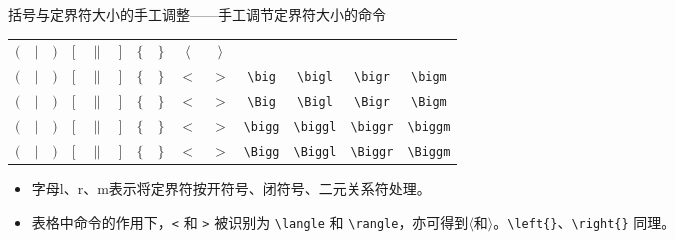 \documentclass[mathserif]{beamer}
\begin{document}
\begin{frame}[fragile]{括号与定界符}{大小的手工调整——手工调节定界符大小的命令}
\begin{table}[H]
\centering
\begin{tabular}{cccccccccc|cccc}
	\toprule
	$($ & $|$ & $)$ & $[$ & $\|$ & $]$ & $\{$ & $\}$ & $\langle$ & $\rangle$ & ~ & ~ & ~ & ~ \\
	$\big($ & $\big|$ & $\big)$ & $\big[$ & $\big\|$ & $\big]$ & $\big\{$ & $\big\}$ & $\big<$ & $\big>$ & \lstinline'\big' & \lstinline'\bigl' & \lstinline'\bigr' & \lstinline'\bigm' \\[1ex]
	$\Big($ & $\Big|$ & $\Big)$ & $\Big[$ & $\Big\|$ & $\Big]$ & $\Big\{$ & $\Big\}$ & $\Big<$ & $\Big>$ & \lstinline'\Big' & \lstinline'\Bigl' & \lstinline'\Bigr' & \lstinline'\Bigm' \\[2ex]
	$\bigg($ & $\bigg|$ & $\bigg)$ & $\bigg[$ & $\bigg\|$ & $\bigg]$ & $\bigg\{$ & $\bigg\}$ & $\bigg<$ & $\bigg>$ & \lstinline'\bigg' & \lstinline'\biggl' & \lstinline'\biggr' & \lstinline'\biggm' \\[3ex]
	$\Bigg($ & $\Bigg|$ & $\Bigg)$ & $\Bigg[$ & $\Bigg\|$ & $\Bigg]$ & $\Bigg\{$ & $\Bigg\}$ & $\Bigg<$ & $\Bigg>$ & \lstinline'\Bigg' & \lstinline'\Biggl' & \lstinline'\Biggr' & \lstinline'\Biggm' \\
	\bottomrule
\end{tabular}
\end{table}
\begin{itemize}

\item 字母l、r、m表示将定界符按开符号、闭符号、二元关系符处理。

\item 表格中命令的作用下，\lstinline'<' 和 \lstinline'>' 被识别为 \lstinline'\langle' 和 \lstinline'\rangle'，亦可得到$\langle$和$\rangle$。\lstinline'\left{}'、\lstinline'\right{}' 同理。

\end{itemize}
\end{frame}
\end{document}
